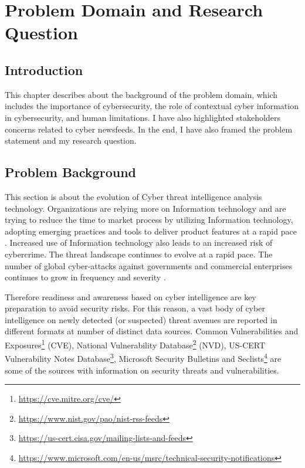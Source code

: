 
\chapter{Problem Domain and Research Question} %

\label{Chapter4_problem-domain} %





\section{Introduction}
This chapter describes about the background of the problem domain, which includes the importance of cybersecurity, the role of contextual cyber information in cybersecurity, and human limitations. 
I have also highlighted stakeholders
\citep{farnham2013tools} concerns related to cyber newsfeeds. 
In the end, I have also 
framed the problem statement and my research question.

\section{Problem Background}
This section is about the evolution of Cyber threat intelligence analysis technology.
Organizations are relying more on Information technology 
and are trying to reduce the time to market process by
utilizing Information technology,
adopting emerging practices 
and tools to deliver product features at a rapid pace
\citep{lederer2001organizations}. 
Increased use of Information technology 
also leads to an increased risk of cybercrime. 
The threat landscape continues to evolve at a rapid pace. 
The number of global cyber-attacks 
against governments and commercial enterprises 
continues to grow in frequency and severity 
\citep{walters2015cyber}.

Therefore readiness and awareness 
based on cyber intelligence 
are key preparation to avoid security risks. 
For this reason, 
a vast body of cyber intelligence 
on newly detected (or suspected) threat avenues 
are reported in different formats 
at number of distinct data sources. 
Common Vulnerabilities and Exposures\footnote{\url{https://cve.mitre.org/cve/}} 
(CVE), 
National Vulnerability Database\footnote{\url{https://www.nist.gov/pao/nist-rss-feeds}} 
(NVD), 
US-CERT Vulnerability Notes Database\footnote{\url{https://us-cert.cisa.gov/mailing-lists-and-feeds}}, 
Microsoft Security Bulletins 
and Seclists\footnote{\url{https://www.microsoft.com/en-us/msrc/technical-security-notifications}} are some of the sources with information on security threats and vulnerabilities.

